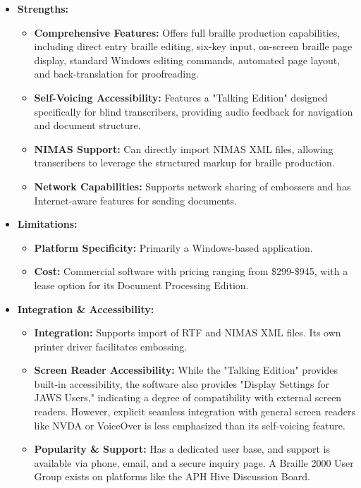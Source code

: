 \begin{itemize}
    \item \textbf{Strengths:}
    \begin{itemize}
        \item \textbf{Comprehensive Features:} Offers full braille production capabilities, including direct entry braille editing, six-key input, on-screen braille page display, standard Windows editing commands, automated page layout, and back-translation for proofreading\footnotemark{}.
        \item \textbf{Self-Voicing Accessibility:} Features a "Talking Edition" designed specifically for blind transcribers, providing audio feedback for navigation and document structure.
        \item \textbf{NIMAS Support:} Can directly import NIMAS XML files, allowing transcribers to leverage the structured markup for braille production\footnotemark{}.
        \item \textbf{Network Capabilities:} Supports network sharing of embossers and has Internet-aware features for sending documents.
    \end{itemize}
    \item \textbf{Limitations:}
    \begin{itemize}
        \item \textbf{Platform Specificity:} Primarily a Windows-based application.
        \item \textbf{Cost:} Commercial software with pricing ranging from \$299-\$945, with a lease option for its Document Processing Edition\footnotemark{}.
    \end{itemize}
    \item \textbf{Integration & Accessibility:}
    \begin{itemize}
        \item \textbf{Integration:} Supports import of RTF and NIMAS XML files. Its own printer driver facilitates embossing.
        \item \textbf{Screen Reader Accessibility:} While the "Talking Edition" provides built-in accessibility, the software also provides "Display Settings for JAWS Users," indicating a degree of compatibility with external screen readers. However, explicit seamless integration with general screen readers like NVDA or VoiceOver is less emphasized than its self-voicing feature.
        \item \textbf{Popularity \& Support:} Has a dedicated user base, and support is available via phone, email, and a secure inquiry page. A Braille 2000 User Group exists on platforms like the APH Hive Discussion Board.
    \end{itemize}
\end{itemize}

